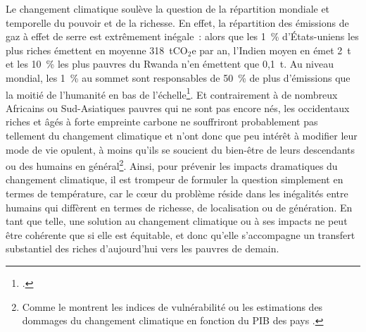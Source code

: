 \documentclass[a5paper,french,openany]{memoir}
\begin{document}
Le changement climatique soulève la question de la répartition mondiale et temporelle du pouvoir et de la richesse. %
En effet, la répartition des émissions de gaz à effet de serre est extrêmement inégale~: alors que les 1~\% d'États-uniens les plus riches émettent en moyenne 318~tCO$_\text{2}$e par an, l'Indien moyen en émet 2~t et les 10~\% les plus pauvres du Rwanda n'en émettent que 0,1~t. %
Au niveau mondial, les 1~\% au sommet sont responsables de 50~\% de plus d'émissions que la moitié de l'humanité en bas de l'échelle\footnote{\cite{chancel_carbon_2015,bruckner_impacts_2022}.}. 
Et contrairement à de nombreux Africains ou Sud-Asiatiques pauvres qui ne sont pas encore nés, les occidentaux riches et âgés à forte empreinte carbone ne souffriront probablement pas tellement du changement climatique et n'ont donc que peu intérêt à modifier leur mode de vie opulent, à moins qu'ils se soucient du bien-être de leurs descendants ou des humains en général\footnote{Comme le montrent les indices de vulnérabilité \citep{chen_university_2015} ou les estimations des dommages du changement climatique en fonction du PIB des pays \citep{burke_global_2015}.}. 
Ainsi, pour prévenir les impacts dramatiques du changement climatique, il est trompeur de formuler la question simplement en termes de température, %
car le cœur du problème réside dans les inégalités entre humains qui diffèrent en termes de richesse, de localisation ou de génération. En tant que telle, une solution au changement climatique ou à ses impacts ne peut être cohérente que si elle est équitable, et donc qu'elle s'accompagne un transfert substantiel des riches d'aujourd'hui vers les pauvres de demain. %
\end{document}
